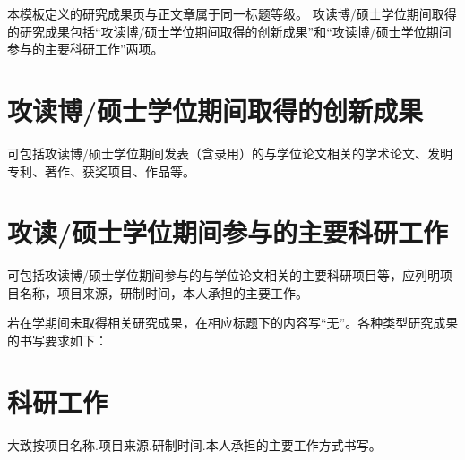 \achievement

本模板定义的研究成果页与正文章属于同一标题等级。
攻读博/硕士学位期间取得的研究成果包括“攻读博/硕士学位期间取得的创新成果”和“攻读博/硕士学位期间参与的主要科研工作”两项。

\section*{攻读博/硕士学位期间取得的创新成果}

可包括攻读博/硕士学位期间发表（含录用）的与学位论文相关的学术论文、发明专利、著作、获奖项目、作品等。

\section*{攻读/硕士学位期间参与的主要科研工作}

可包括攻读博/硕士学位期间参与的与学位论文相关的主要科研项目等，应列明项目名称，项目来源，研制时间，本人承担的主要工作。

若在学期间未取得相关研究成果，在相应标题下的内容写“无”。各种类型研究成果的书写要求如下：




\section*{科研工作}

大致按项目名称.项目来源.研制时间.本人承担的主要工作方式书写。
